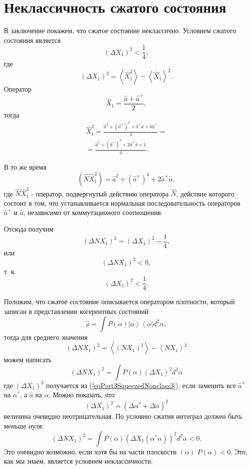 \section{Неклассичность сжатого состояния}
В заключение покажем, что сжатое состояние неклассично. Условием
сжатого состояния является 
\begin{equation}
\left(\Delta X_1\right)^2 < \frac{1}{4},
\nonumber
\end{equation}
где 
\[
\left(\Delta X_1\right)^2 =
\left<\hat{X}_1^2\right> - 
\left<\hat{X}_1\right>^2.
\]
Оператор
\[
\hat{X}_1 = \frac{\hat{a} + \hat{a}^{+}}{2},
\]
тогда 
\begin{eqnarray}
\hat{X}_1^2 = \frac{\hat{a}^2 + \left(\hat{a}^{+}\right)^2 +
  \hat{a}^{+}\hat{a} + \hat{a} \hat{a}^{+}}{4} = 
\nonumber \\
=
\frac{\hat{a}^2 + \left(\hat{a}^{+}\right)^2 +
  2 \hat{a}^{+}\hat{a} + 1}{4}.
\nonumber
\end{eqnarray}

В то же время 
\[
\left(\hat{N}\hat{X}_1^2\right) = 
\hat{a}^2 + \left(\hat{a}^{+}\right)^2 +
2 \hat{a}^{+}\hat{a},
\]
где $\hat{N}\hat{X}_1^2$ - оператор, подвергнутый действию оператора
$\hat{N}$, действие которого состоит в том, что устанавливается
нормальная последовательность операторов $\hat{a}^{+}$ и $\hat{a}$,
независимо от коммутационого соотношения.

Отсюда получим
\begin{equation}
\left(\Delta N X_1\right)^2 = 
\left(\Delta X_1\right)^2 - \frac{1}{4},
\nonumber
\end{equation}
или
\begin{equation}
\left(\Delta N X_1\right)^2 < 0,
\nonumber
\end{equation}
т. к. 
\[
\left(\Delta X_1\right)^2 < \frac{1}{4}.
\]

Положим, что сжатое состояние описывается оператором плотности,
который записан в представлении когерентных состояний
\[
\hat{\rho} = \int P\left(\alpha\right)
\left|\alpha\right>
\left<\alpha\right| d^2 \alpha,
\]
тогда для среднего значения 
\begin{equation}
\left(\Delta N X_1\right)^2 = 
\left<\left(N X_1\right)^2\right> - \left<N X_1\right>^2 
\label{eqPart3SqueezedNonclass3}
\end{equation}
можем написать
\[
\left(\Delta N X_1\right)^2 = 
 \int 
P\left(\alpha\right)
\left(\Delta X_1\right)^2
d^2 \alpha
\]
где $\left(\Delta X_1\right)^2$ получается из
(\ref{eqPart3SqueezedNonclass3}), если заменить все $\hat{a}^{+}$ на
$\alpha^{*}$, а $\hat{a}$ на $\alpha$. Можно показать, что
\[
\left(\Delta X_1\right)^2 = \left(\Delta \alpha^{*} + \Delta \alpha\right)^2
\]
величина очевидно неотрицательная. По условию сжатия интеграл должен
быть меньше нуля:
\begin{equation}
\left(\Delta N X_1\right)^2 = 
 \int 
P\left(\alpha\right)
\left(\Delta X_1\left(\alpha^{*}\alpha\right)\right)^2
d^2 \alpha < 0.
\nonumber
\end{equation}
Это очевидно возможно, если хотя бы на части плоскости
$\left(\alpha\right)$ $P\left(\alpha\right) < 0$. Это, как мы знаем,
является условием неклассичности. 

